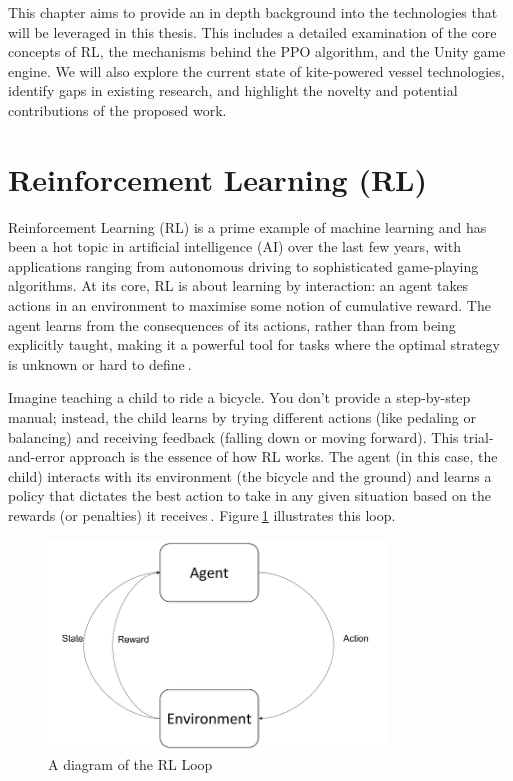 This chapter aims to provide an in depth background into the technologies that will be leveraged in this thesis. This includes a detailed examination of the core concepts of RL, the mechanisms behind the PPO algorithm, and the Unity game engine. We will also explore the current state of kite-powered vessel technologies, identify gaps in existing research, and highlight the novelty and potential contributions of the proposed work.

\section{Reinforcement Learning (RL)}\label{RL_background}

Reinforcement Learning (RL) is a prime example of machine learning and has been a hot topic in artificial intelligence (AI) over the last few years, with applications ranging from autonomous driving to sophisticated game-playing algorithms. At its core, RL is about learning by interaction: an agent takes actions in an environment to maximise some notion of cumulative reward. The agent learns from the consequences of its actions, rather than from being explicitly taught, making it a powerful tool for tasks where the optimal strategy is unknown or hard to define$~$\cite{sutton2018reinforcement}.

Imagine teaching a child to ride a bicycle. You don't provide a step-by-step manual; instead, the child learns by trying different actions (like pedaling or balancing) and receiving feedback (falling down or moving forward). This trial-and-error approach is the essence of how RL works. The agent (in this case, the child) interacts with its environment (the bicycle and the ground) and learns a policy that dictates the best action to take in any given situation based on the rewards (or penalties) it receives$~$\cite{watkins1992qlearning}. Figure$~$\ref{fig:rl_diagram} illustrates this loop.

\begin{figure}
    \centering
    \includegraphics[width=0.8\textwidth]{Images/RL_Loop.png}
    \caption{A diagram of the RL Loop}\label{fig:rl_diagram}
\end{figure}

